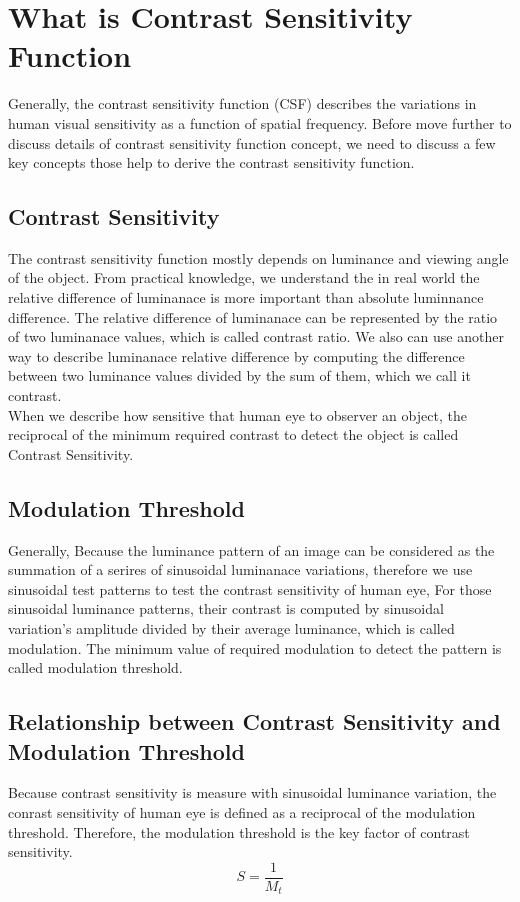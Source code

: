 \documentclass{article}
\begin{document}
\section{What is Contrast Sensitivity Function}
\label{sec:CSF concept}
Generally, the contrast sensitivity function (CSF) describes the variations in human visual sensitivity as a function of spatial frequency. Before move further to discuss details of contrast sensitivity  function concept, we need to discuss a few key concepts those help to derive the contrast sensitivity function.\\
\subsection{Contrast Sensitivity}
The contrast sensitivity function mostly depends on luminance and viewing angle of the object. From practical knowledge, we understand the in real world the relative difference of luminanace is more important than absolute luminnance difference. The relative difference of luminanace can be represented by the ratio of two luminanace values, which is called contrast ratio. We also can use another way to describe luminanace relative difference by computing the difference between two luminance values divided by the sum of them, which we call it contrast.\\
When we describe how sensitive that human eye to observer an object, the reciprocal of the minimum required contrast to detect the object is called Contrast Sensitivity.
\subsection{Modulation Threshold}
Generally, Because the luminance pattern of an image can be considered as the summation of a serires of sinusoidal luminanace variations, therefore we use sinusoidal test patterns to test the contrast sensitivity of human eye, For those sinusoidal luminance patterns, their contrast is computed by sinusoidal variation's amplitude divided by their average luminance, which is called modulation. The minimum value of required modulation to detect the pattern is called modulation threshold.
\subsection{Relationship between Contrast Sensitivity and Modulation Threshold}
Because contrast sensitivity is measure with sinusoidal luminance variation, the conrast sensitivity of human eye is defined as a reciprocal of the modulation threshold. Therefore, the modulation threshold is the key factor of contrast sensitivity.
\begin{equation}
    \label{eq:s_m}
    S = \frac{1}{M_t}
\end{equation}
\end{document}
